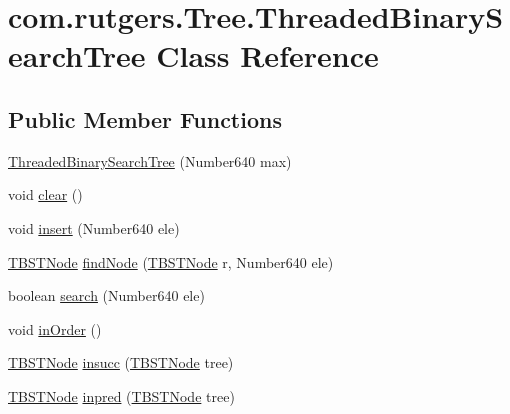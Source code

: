 \hypertarget{classcom_1_1rutgers_1_1Tree_1_1ThreadedBinarySearchTree}{}\section{com.\+rutgers.\+Tree.\+Threaded\+Binary\+Search\+Tree Class Reference}
\label{classcom_1_1rutgers_1_1Tree_1_1ThreadedBinarySearchTree}
\subsection*{Public Member Functions}
\begin{DoxyCompactItemize}
\item 
\hyperlink{classcom_1_1rutgers_1_1Tree_1_1ThreadedBinarySearchTree_a0847504e068dd871b568dcce45a7ab58}{Threaded\+Binary\+Search\+Tree} (Number640 max)
\item 
void \hyperlink{classcom_1_1rutgers_1_1Tree_1_1ThreadedBinarySearchTree_a8b45071deaf21a12e3d4479de4dc5881}{clear} ()
\item 
void \hyperlink{classcom_1_1rutgers_1_1Tree_1_1ThreadedBinarySearchTree_a09f162ef950f5ea1398ebba5cb091695}{insert} (Number640 ele)
\item 
\hyperlink{classcom_1_1rutgers_1_1Tree_1_1TBSTNode}{T\+B\+S\+T\+Node} \hyperlink{classcom_1_1rutgers_1_1Tree_1_1ThreadedBinarySearchTree_ae13ad9cac57fe78e1535e9488504e90c}{find\+Node} (\hyperlink{classcom_1_1rutgers_1_1Tree_1_1TBSTNode}{T\+B\+S\+T\+Node} r, Number640 ele)
\item 
boolean \hyperlink{classcom_1_1rutgers_1_1Tree_1_1ThreadedBinarySearchTree_abe8456f4ad7777a85ecc95c2f9ad1fb6}{search} (Number640 ele)
\item 
void \hyperlink{classcom_1_1rutgers_1_1Tree_1_1ThreadedBinarySearchTree_af5820fab14b588330df7cdbb7390cf97}{in\+Order} ()
\item 
\hyperlink{classcom_1_1rutgers_1_1Tree_1_1TBSTNode}{T\+B\+S\+T\+Node} \hyperlink{classcom_1_1rutgers_1_1Tree_1_1ThreadedBinarySearchTree_ae17e83562ac1ae7b328b7d90467bbeaa}{insucc} (\hyperlink{classcom_1_1rutgers_1_1Tree_1_1TBSTNode}{T\+B\+S\+T\+Node} tree)
\item 
\hyperlink{classcom_1_1rutgers_1_1Tree_1_1TBSTNode}{T\+B\+S\+T\+Node} \hyperlink{classcom_1_1rutgers_1_1Tree_1_1ThreadedBinarySearchTree_af4b5e17d6489ec5f6ae02f225a75e1f4}{inpred} (\hyperlink{classcom_1_1rutgers_1_1Tree_1_1TBSTNode}{T\+B\+S\+T\+Node} tree)
\end{DoxyCompactItemize}


